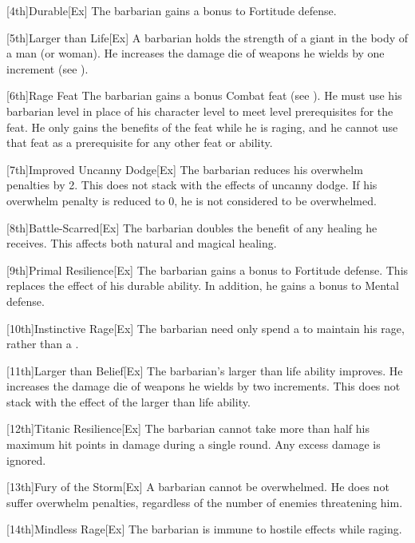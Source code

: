         [4th]{Durable}[Ex]
        The barbarian gains a  bonus to Fortitude defense.

        [5th]{Larger than Life}[Ex]
        A barbarian holds the strength of a giant in the body of a man (or woman).
        He increases the damage die of weapons he wields by one increment (see ).

        [6th]{Rage Feat}
        The barbarian gains a bonus Combat feat (see ).
        He must use his barbarian level in place of his character level to meet level prerequisites for the feat.
        He only gains the benefits of the feat while he is raging, and he cannot use that feat as a prerequisite for any other feat or ability.

        [7th]{Improved Uncanny Dodge}[Ex]
        The barbarian reduces his overwhelm penalties by 2.
        This does not stack with the effects of uncanny dodge.
        If his overwhelm penalty is reduced to 0, he is not considered to be overwhelmed.

        [8th]{Battle-Scarred}[Ex]
        The barbarian doubles the benefit of any healing he receives.
        This affects both natural and magical healing.

        [9th]{Primal Resilience}[Ex]
        The barbarian gains a  bonus to Fortitude defense.
        This replaces the effect of his durable ability.
        In addition, he gains a  bonus to Mental defense.

        [10th]{Instinctive Rage}[Ex]
        The barbarian need only spend a  to maintain his rage, rather than a .

        [11th]{Larger than Belief}[Ex]
        The barbarian's larger than life ability improves.
        He increases the damage die of weapons he wields by two increments.
        This does not stack with the effect of the larger than life ability.

        [12th]{Titanic Resilience}[Ex]
        The barbarian cannot take more than half his maximum hit points in damage during a single round.
        Any excess damage is ignored.

        [13th]{Fury of the Storm}[Ex]
        A barbarian cannot be overwhelmed.
        He does not suffer overwhelm penalties, regardless of the number of enemies threatening him.

        [14th]{Mindless Rage}[Ex]
        The barbarian is immune to hostile  effects while raging.

